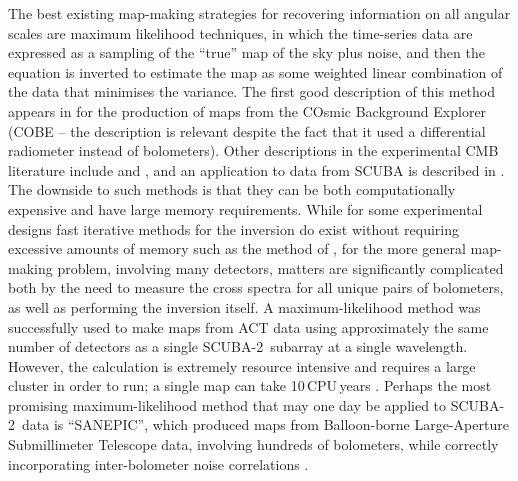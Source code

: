 \documentclass[useAMS,usenatbib,nofootinbib]{mn2e}
\newcommand{\scuba}{SCUBA-2}
\begin{document}
The best existing map-making strategies for recovering information on
all angular scales are maximum likelihood techniques, in which the
time-series data are expressed as a sampling of the ``true'' map of
the sky plus noise, and then the equation is inverted to estimate the
map as some weighted linear combination of the data that minimises the
variance.  The first good description of this method appears in
\citet{janssen1992} for the production of maps from the COsmic
Background Explorer (COBE -- the description is relevant despite the
fact that it used a differential radiometer instead of
bolometers). Other descriptions in the experimental CMB literature
include \citet{tegmark1997} and \citet{stompor2002}, and an
application to data from SCUBA is described in \citet{borys2004}.  The
downside to such methods is that they can be both computationally
expensive and have large memory requirements. While for some
experimental designs fast iterative methods for the inversion do exist
without requiring excessive amounts of memory such as the method of
\citet{wright1996} \citep[which was later implemented for SCUBA
by][]{johnstone2000}, for the more general map-making problem,
involving many detectors, matters are significantly complicated both
by the need to measure the cross spectra for all unique pairs of
bolometers, as well as performing the inversion itself. A
maximum-likelihood method was successfully used to make maps from ACT
data using approximately the same number of detectors as a single
\scuba\ subarray at a single wavelength. However, the calculation is
extremely resource intensive and requires a large cluster in order to
run; a single map can take 10\,CPU\,years \citep{fowler2010}. Perhaps
the most promising maximum-likelihood method that may one day be
applied to \scuba\ data is ``SANEPIC'', which produced maps from
Balloon-borne Large-Aperture Submillimeter Telescope data, involving
hundreds of bolometers, while correctly incorporating inter-bolometer
noise correlations \citep[][]{patanchon2008}.
\end{document}
